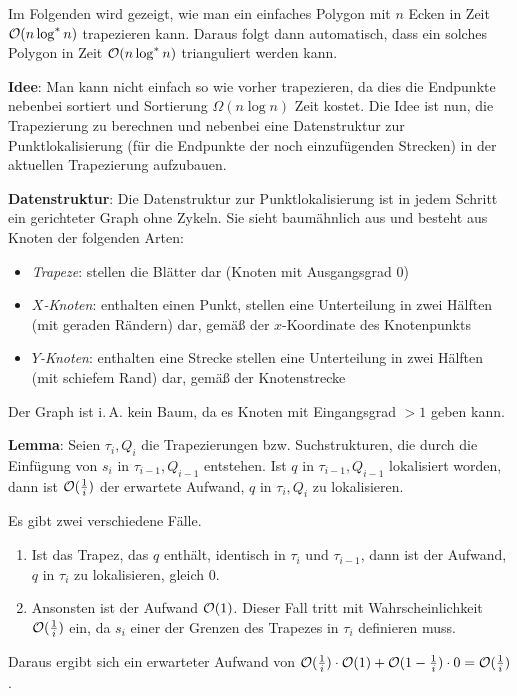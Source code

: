 Im Folgenden wird gezeigt, wie man ein einfaches Polygon mit $n$ Ecken in Zeit
$\mathcal{O}(n \log^\ast n)$ trapezieren kann.
Daraus folgt dann automatisch, dass ein solches Polygon in Zeit $\mathcal{O}(n \log^\ast n)$
trianguliert werden kann.

\textbf{Idee}:
Man kann nicht einfach so wie vorher trapezieren, da dies die Endpunkte nebenbei sortiert und
Sortierung $\Omega(n \log n)$ Zeit kostet.
Die Idee ist nun, die Trapezierung zu berechnen und nebenbei eine Datenstruktur zur
Punktlokalisierung (für die Endpunkte der noch einzufügenden Strecken)
in der aktuellen Trapezierung aufzubauen.

\textbf{Datenstruktur}:
Die Datenstruktur zur Punktlokalisierung ist in jedem Schritt ein gerichteter Graph ohne Zykeln.
Sie sieht baumähnlich aus und besteht aus Knoten der folgenden Arten:
\begin{itemize}
    \item
    \emph{Trapeze}:
    stellen die Blätter dar (Knoten mit Ausgangsgrad $0$)

    \item
    \emph{$X$-Knoten}:
    enthalten einen Punkt,
    stellen eine Unterteilung in zwei Hälften
    (mit geraden Rändern) dar, gemäß der $x$-Koordinate des Knotenpunkts

    \item
    \emph{$Y$-Knoten}:
    enthalten eine Strecke
    stellen eine Unterteilung in zwei Hälften
    (mit schiefem Rand) dar, gemäß der Knotenstrecke
\end{itemize}
Der Graph ist i.\,A. kein Baum, da es Knoten mit Eingangsgrad $> 1$ geben kann.

\linie

\textbf{Lemma}:
Seien $\tau_i, Q_i$ die Trapezierungen bzw. Suchstrukturen, die durch die Einfügung von
$s_i$ in $\tau_{i-1}, Q_{i-1}$ entstehen.
Ist $q$ in $\tau_{i-1}, Q_{i-1}$ lokalisiert worden,
dann ist $\mathcal{O}(\frac{1}{i})$ der erwartete Aufwand,
$q$ in $\tau_i, Q_i$ zu lokalisieren.

\begin{Beweis}
    Es gibt zwei verschiedene Fälle.
    \begin{enumerate}
        \item
        Ist das Trapez, das $q$ enthält, identisch in $\tau_i$ und $\tau_{i-1}$,
        dann ist der Aufwand, $q$ in $\tau_i$ zu lokalisieren, gleich $0$.

        \item
        Ansonsten ist der Aufwand $\mathcal{O}(1)$.
        Dieser Fall tritt mit Wahrscheinlichkeit $\mathcal{O}(\frac{1}{i})$ ein, da $s_i$
        einer der Grenzen des Trapezes in $\tau_i$ definieren muss.
    \end{enumerate}
    Daraus ergibt sich ein erwarteter Aufwand von
    $\mathcal{O}(\frac{1}{i}) \cdot \mathcal{O}(1) + \mathcal{O}(1 - \frac{1}{i}) \cdot 0 = \mathcal{O}(\frac{1}{i})$.
\end{Beweis}

